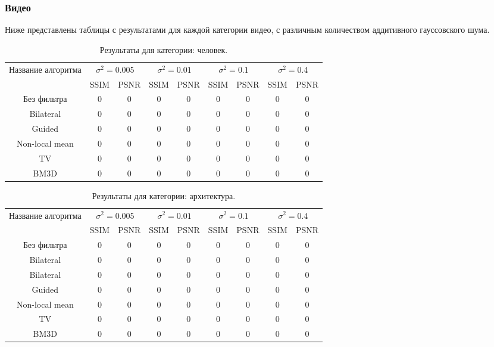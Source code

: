 \subsubsection{Видео}
Ниже представлены таблицы с результатами для каждой категории видео, с различным количеством аддитивного гауссовского шума.
\begin{table}[H]
	\caption{\label{tab:bolts} Результаты для категории: человек.}
	\begin{tabular}{|c|c|c|c|c|c|c|c|c|}
		\hline
	Название алгоритма & \multicolumn{2}{|c|}{$\sigma^2=0.005$}  & \multicolumn{2}{|c|}{$\sigma^2=0.01$}& \multicolumn{2}{|c|}{$\sigma^2=0.1$} & \multicolumn{2}{|c|}{$\sigma^2=0.4$} \\
		\cline{2-9}
		& SSIM  & PSNR & SSIM  & PSNR & SSIM  & PSNR & SSIM  & PSNR\\
		\hline
		Без фильтра & 0 & 0& 0 & 0& 0 & 0 & 0 & 0 \\
		\hline
		Bilateral & 0 & 0& 0 & 0& 0 & 0 & 0 & 0 \\
		\hline
		Guided & 0 & 0& 0 & 0& 0 & 0 & 0 & 0 \\
		\hline
		Non-local mean & 0 & 0& 0 & 0& 0 & 0 & 0 & 0 \\
		\hline
		TV & 0 & 0& 0 & 0& 0 & 0 & 0 & 0 \\
		\hline
		BM3D & 0 & 0& 0 & 0& 0 & 0 & 0 & 0 \\
		\hline	
	\end{tabular}
\end{table}

\begin{table}[H]
	\caption{\label{tab:bolts} Результаты для категории: архитектура.}
	\begin{tabular}{|c|c|c|c|c|c|c|c|c|}
		\hline
	Название алгоритма & \multicolumn{2}{|c|}{$\sigma^2=0.005$}  & \multicolumn{2}{|c|}{$\sigma^2=0.01$}& \multicolumn{2}{|c|}{$\sigma^2=0.1$} & \multicolumn{2}{|c|}{$\sigma^2=0.4$} \\
		\cline{2-9}
		& SSIM  & PSNR & SSIM  & PSNR & SSIM  & PSNR & SSIM  & PSNR\\
		\hline
Без фильтра & 0 & 0& 0 & 0& 0 & 0 & 0 & 0 \\
\hline
		Bilateral & 0 & 0& 0 & 0& 0 & 0 & 0 & 0 \\
		\hline
		Bilateral & 0 & 0& 0 & 0& 0 & 0 & 0 & 0 \\
		\hline
		Guided & 0 & 0& 0 & 0& 0 & 0 & 0 & 0 \\
		\hline
		Non-local mean & 0 & 0& 0 & 0& 0 & 0 & 0 & 0 \\
		\hline
		TV & 0 & 0& 0 & 0& 0 & 0 & 0 & 0 \\
		\hline
		BM3D & 0 & 0& 0 & 0& 0 & 0 & 0 & 0 \\
		\hline	
	\end{tabular}
\end{table}

